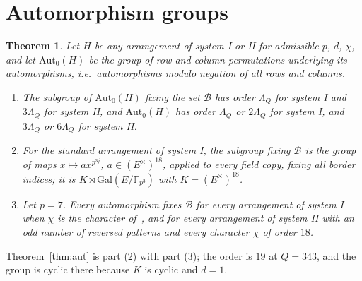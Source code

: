 \documentclass[11pt]{article}
\theoremstyle{plain}
\newtheorem{theorem}{Theorem}[section]
\theoremstyle{definition}
\theoremstyle{remark}
\newcommand{\F}{\mathbb F}
\newcommand{\Aut}{\mathrm{Aut}}
\newcommand{\Gal}{\mathrm{Gal}}
\begin{document}
\section{Automorphism groups}\label{sec:aut}

\begin{theorem}\label{thm:groups}
Let $H$ be any arrangement of system I or II for admissible $p$, $d$, $\chi$,
and let $\Aut_0(H)$ be the group of row-and-column permutations underlying its
automorphisms, i.e.\ automorphisms modulo negation of all rows and columns.
\begin{enumerate}
\item The subgroup of $\Aut_0(H)$ fixing the set $\mathcal B$ has order $\Lambda_Q$
for system I and $3\Lambda_Q$ for system II, and $\Aut_0(H)$ has order $\Lambda_Q$ or
$2\Lambda_Q$ for system I, and $3\Lambda_Q$ or $6\Lambda_Q$ for system II.
\item For the standard arrangement of system I, the subgroup fixing
$\mathcal B$ is the group of maps $x\mapsto ax^{p^{3j}}$, $a\in(E^\times)^{18}$,
applied to every field copy, fixing all border indices; it is
$K\rtimes\Gal(E/\F_{p^3})$ with $K=(E^\times)^{18}$.
\item Let $p=7$. Every automorphism fixes $\mathcal B$ for every
arrangement of system I when $\chi$ is the character of~\cite{Kline18}, and
for every arrangement of system II with an odd number of reversed patterns
and every character $\chi$ of order $18$.
\end{enumerate}
\end{theorem}

Theorem~\ref{thm:aut} is part (2) with part (3); the order is $19$ at
$Q=343$, and the group is cyclic there because $K$ is cyclic and $d=1$.
\end{document}
